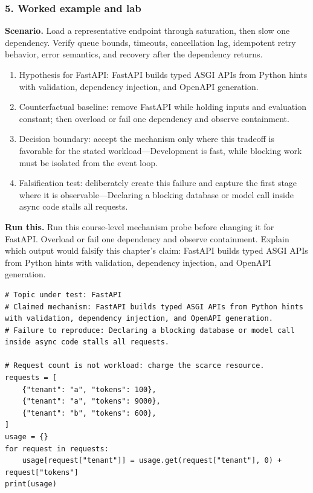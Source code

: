 \subsubsection*{5. Worked example and lab}
\textbf{Scenario.} Load a representative endpoint through saturation, then slow one dependency. Verify queue bounds, timeouts, cancellation lag, idempotent retry behavior, error semantics, and recovery after the dependency returns.
\begin{enumerate}
\item Hypothesis for FastAPI: FastAPI builds typed ASGI APIs from Python hints with validation, dependency injection, and OpenAPI generation.
\item Counterfactual baseline: remove FastAPI while holding inputs and evaluation constant; then overload or fail one dependency and observe containment.
\item Decision boundary: accept the mechanism only where this tradeoff is favorable for the stated workload—Development is fast, while blocking work must be isolated from the event loop.
\item Falsification test: deliberately create this failure and capture the first stage where it is observable—Declaring a blocking database or model call inside async code stalls all requests.
\end{enumerate}
\textbf{Run this.} Run this course-level mechanism probe before changing it for FastAPI. Overload or fail one dependency and observe containment. Explain which output would falsify this chapter's claim: FastAPI builds typed ASGI APIs from Python hints with validation, dependency injection, and OpenAPI generation.
\begin{Verbatim}[fontsize=\scriptsize]
# Topic under test: FastAPI
# Claimed mechanism: FastAPI builds typed ASGI APIs from Python hints with validation, dependency injection, and OpenAPI generation.
# Failure to reproduce: Declaring a blocking database or model call inside async code stalls all requests.

# Request count is not workload: charge the scarce resource.
requests = [
    {"tenant": "a", "tokens": 100},
    {"tenant": "a", "tokens": 9000},
    {"tenant": "b", "tokens": 600},
]
usage = {}
for request in requests:
    usage[request["tenant"]] = usage.get(request["tenant"], 0) + request["tokens"]
print(usage)
\end{Verbatim}
